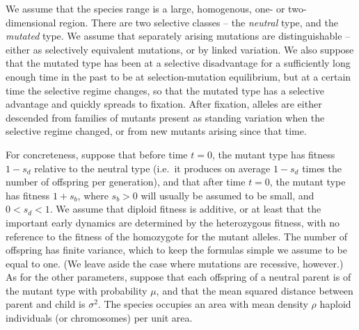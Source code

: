 \documentclass{article}
\begin{document}

We assume that the species range
is a large, homogenous, one- or two-dimensional region. 
There are two selective classes -- the {\em neutral} type, and the {\em mutated} type.
We assume that separately arising mutations are distinguishable --
either as selectively equivalent mutations, or by linked variation.
We also suppose that 
the mutated type has been at a selective disadvantage 
for a sufficiently long enough time in the past to be at selection-mutation equilibrium,
but at a certain time the selective regime changes, so that the mutated type has a selective advantage and quickly spreads to fixation.
After fixation, alleles are either descended
from families of mutants present as standing variation when the selective regime changed,
or from new mutants arising since that time.

For concreteness, suppose that before time $t=0$,
the mutant type has fitness $1-s_d$ relative to the neutral type
(i.e.\ it produces on average $1-s_d$ times the number of offspring per generation),
and that after time $t=0$,
the mutant type has fitness $1+s_b$,
where $s_b>0$ will usually be assumed to be small, and $0<s_d<1$.
We assume that diploid fitness is additive, or at least that the
important early dynamics are determined by the heterozygous fitness, with no reference to the fitness of the
homozygote for the mutant alleles.
The number of offspring has finite variance, which to keep the formulas simple we assume to be equal to one.
(We leave aside the case where mutations are recessive, however.)
As for the other parameters,
suppose that each offspring of a neutral parent is of the mutant type with probability $\mu$,
and that the mean squared distance between parent and child is $\sigma^2$.
The species occupies an area with mean density
$\rho$ haploid individuals (or chromosomes) per unit area.


\end{document}
